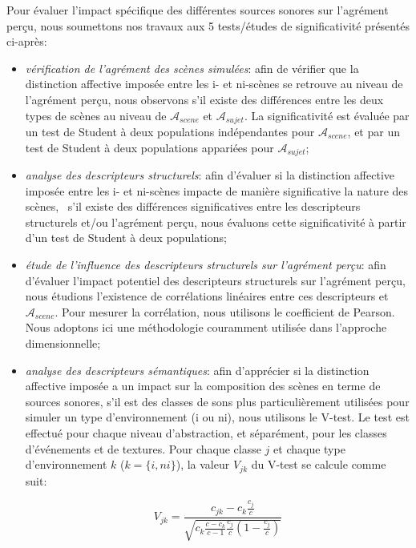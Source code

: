 \documentclass[twoside,twocolumn]{article}
\begin{document}
Pour évaluer l'impact spécifique des différentes sources sonores sur l'agrément perçu, nous soumettons nos travaux aux 5 tests/études de significativité présentés ci-après:

\begin{itemize}
\item \emph{vérification de l'agrément des scènes simulées}: afin de vérifier que la distinction affective imposée entre les i- et ni-scènes se retrouve au niveau de l'agrément perçu, nous observons s'il existe des différences entre les deux types de scènes au niveau de $\mathcal{A}_{scene}$ et $\mathcal{A}_{sujet}$. La significativité est évaluée par un test de Student à deux populations indépendantes pour $\mathcal{A}_{scene}$, et par un test de Student à deux populations appariées pour $\mathcal{A}_{sujet}$;
\item \emph{analyse des descripteurs structurels}: afin d'évaluer si la distinction affective imposée entre les i- et ni-scènes impacte de manière significative la nature des scènes, \ie~s'il existe des différences significatives entre les descripteurs structurels et/ou l'agrément perçu, nous évaluons cette significativité à partir d'un test de Student à deux populations;
\item \emph{étude de l'influence des descripteurs structurels sur l'agrément perçu}: afin d'évaluer l'impact potentiel des descripteurs structurels sur l'agrément perçu, nous étudions l'existence de corrélations linéaires entre ces descripteurs et $\mathcal{A}_{scene}$. Pour mesurer la corrélation, nous utilisons le coefficient de Pearson. Nous adoptons ici une méthodologie couramment utilisée dans l'approche dimensionnelle;
\item \emph{analyse des descripteurs sémantiques}: afin d'apprécier si la distinction affective imposée a un impact sur la composition des scènes en terme de sources sonores, s'il est des classes de sons plus particulièrement utilisées pour simuler un type d'environnement (i ou ni), nous utilisons le V-test. Le test est effectué pour chaque niveau d'abstraction, et séparément, pour les classes d'événements et de textures. Pour chaque classe $j$ et chaque type d'environnement $k$ ($k=\lbrace i,ni\rbrace$), la valeur $V_{jk}$ du V-test se calcule comme suit:

\begin{equation*}
V_{jk}=\dfrac{c_{jk}-c_k\frac{c_j}{c}}{\sqrt{c_k\frac{c-c_k}{c-1}\frac{c_j}{c}(1-\frac{c_j}{c})}}
\end{equation*}


\end{itemize}
\end{document}
